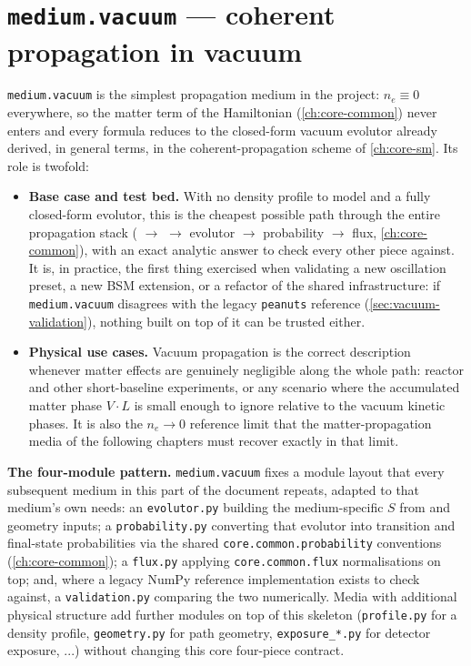 \chapter{\texttt{medium.vacuum} --- coherent propagation in vacuum}
\label{ch:vacuum}

\texttt{medium.vacuum} is the simplest propagation medium in the project:
$n_e\equiv0$ everywhere, so the matter term of the Hamiltonian
(\cref{ch:core-common}) never enters and every formula reduces to the
closed-form vacuum evolutor already derived, in general terms, in the
coherent-propagation scheme of \cref{ch:core-sm}. Its role is twofold:

\begin{itemize}
  \item \textbf{Base case and test bed.} With no density profile to model
    and a fully closed-form evolutor, this is the cheapest possible path
    through the entire propagation stack ( $\to$
     $\to$ evolutor $\to$ probability
    $\to$ flux, \cref{ch:core-common}), with an exact analytic answer to
    check every other piece against. It is, in practice, the first thing
    exercised when validating a new oscillation preset, a new BSM
    extension, or a refactor of the shared infrastructure: if
    \texttt{medium.vacuum} disagrees with the legacy \texttt{peanuts}
    reference (\cref{sec:vacuum-validation}), nothing built on top of it
    can be trusted either.
  \item \textbf{Physical use cases.} Vacuum propagation is the correct
    description whenever matter effects are genuinely negligible along the
    whole path: reactor and other short-baseline experiments, or any
    scenario where the accumulated matter phase $V\cdot L$ is small enough
    to ignore relative to the vacuum kinetic phases. It is also the
    $n_e\to0$ reference limit that the matter-propagation media of the
    following chapters must recover exactly in that limit.
\end{itemize}

\begin{notebox}
\textbf{The four-module pattern.} \texttt{medium.vacuum} fixes a module
layout that every subsequent medium in this part of the document repeats,
adapted to that medium's own needs: an \texttt{evolutor.py} building the
medium-specific $S$ from  and geometry
inputs; a \texttt{probability.py} converting that evolutor into transition
and final-state probabilities via the shared
\texttt{core.common.probability} conventions (\cref{ch:core-common}); a
\texttt{flux.py} applying \texttt{core.common.flux} normalisations on top;
and, where a legacy NumPy reference implementation exists to check against,
a \texttt{validation.py} comparing the two numerically. Media with
additional physical structure add further modules on top of this
skeleton (\texttt{profile.py} for a density profile,
\texttt{geometry.py} for path geometry, \texttt{exposure\_*.py} for
detector exposure, ...) without changing this core four-piece contract.
\end{notebox}


